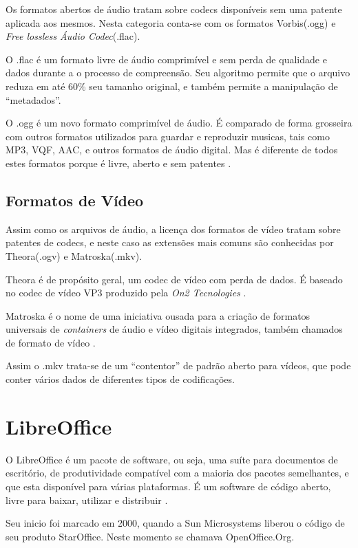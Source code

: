 Os formatos abertos de áudio tratam sobre codecs disponíveis sem uma patente aplicada aos mesmos. Nesta categoria conta-se com os formatos Vorbis(.ogg) e \textit{Free lossless Áudio Codec}(.flac).

O .flac é um formato livre de áudio comprimível e sem perda de qualidade e dados durante a o processo de compreensão. Seu algoritmo permite que o arquivo reduza em até 60\% seu tamanho original, e também permite a manipulação de ``metadados''.

O .ogg é um novo formato comprimível de áudio. 
É comparado de forma grosseira com outros formatos utilizados para guardar e reproduzir musicas, tais como MP3, VQF, AAC, e outros formatos de áudio digital. Mas é diferente de todos estes formatos porque é livre, aberto e sem patentes \cite{XIPH}.

\subsection{Formatos de Vídeo}

Assim como os arquivos de áudio, a licença dos formatos de vídeo tratam sobre patentes de codecs, e neste caso as extensões mais comuns são conhecidas por Theora(.ogv) e Matroska(.mkv).

Theora é de propósito geral, um codec de vídeo com perda de dados. É baseado no codec de vídeo VP3 produzido pela \textit{On2 Tecnologies} \cite{XIPH-THEORA}.

Matroska é o nome de uma iniciativa ousada para a criação de formatos universais de \textit{containers} de áudio e vídeo digitais integrados, também chamados de formato de vídeo \cite{WIKIPEDIA-MATROSKA}.

Assim o .mkv trata-se de um ``contentor'' de padrão aberto para vídeos, que pode conter vários dados de diferentes tipos de codificações.

\section{LibreOffice}

O LibreOffice é um pacote de software, ou seja, uma suíte para documentos de escritório, de produtividade compatível com a maioria dos pacotes semelhantes, e que esta disponível para várias plataformas. É um software de código aberto, livre para baixar, utilizar e distribuir \cite{LibreOffice}.

Seu inicio foi marcado em 2000, quando a Sun Microsystems liberou o código de seu produto StarOffice. Neste momento se chamava OpenOffice.Org. 

